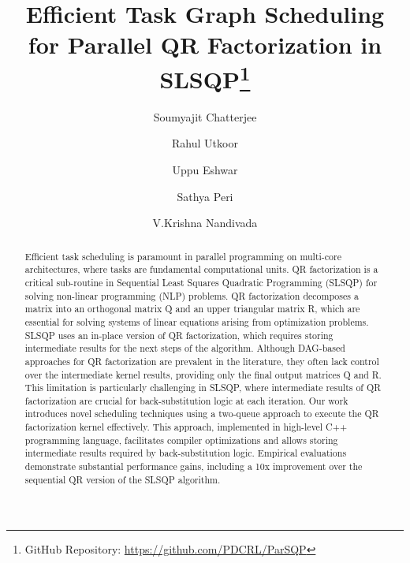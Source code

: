 \documentclass[runningheads]{llncs}
\begin{document}
\title{Efficient Task Graph Scheduling for Parallel QR Factorization in SLSQP\thanks{GitHub Repository: \url{https://github.com/PDCRL/ParSQP}}}
%
%
\author{
Soumyajit Chatterjee  \Envelope  \and
Rahul Utkoor\and
Uppu Eshwar \and
Sathya Peri\and
V.Krishna Nandivada
}



\maketitle              

\begin{abstract}
Efficient task scheduling is paramount in parallel programming on multi-core architectures, where tasks are fundamental computational units. QR factorization is a critical sub-routine in Sequential Least Squares Quadratic Programming (SLSQP) for solving non-linear programming (NLP) problems. QR factorization decomposes a matrix into an orthogonal matrix Q and an upper triangular matrix R, which are essential for solving systems of linear equations arising from optimization problems. SLSQP uses an in-place version of QR factorization, which requires storing intermediate results for the next steps of the algorithm. Although DAG-based approaches for QR factorization are prevalent in the literature, they often lack control over the intermediate kernel results, providing only the final output matrices Q and R. This limitation is particularly challenging in SLSQP, where intermediate results of QR factorization are crucial for back-substitution logic at each iteration. Our work introduces novel scheduling techniques using a two-queue approach to execute the QR factorization kernel effectively. This approach, implemented in high-level C++ programming language, facilitates compiler optimizations and allows storing intermediate results required by back-substitution logic. Empirical evaluations demonstrate substantial performance gains, including a 10x improvement over the sequential QR version of the SLSQP algorithm.

\end{abstract}
\end{document}
